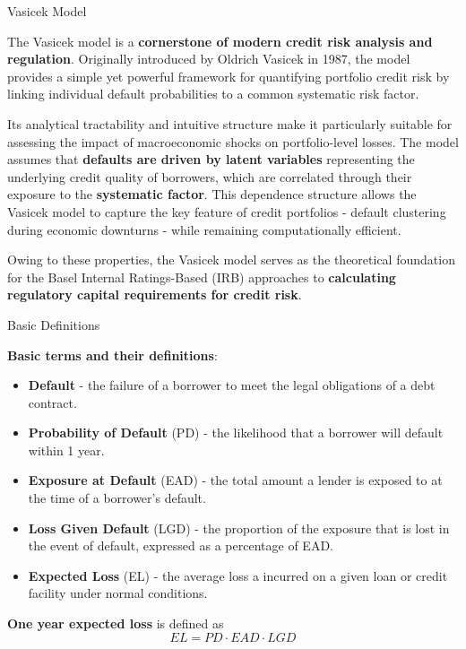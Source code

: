 \documentclass{beamer}
\begin{document}
\begin{frame}{Vasicek Model}
\justifying
\small

The Vasicek model is a \textbf{cornerstone of modern credit risk analysis and regulation}. Originally introduced by Oldrich Vasicek in 1987, the model provides a simple yet powerful framework for quantifying portfolio credit risk by linking individual default probabilities to a common systematic risk factor.

\medskip

Its analytical tractability and intuitive structure make it particularly suitable for assessing the impact of macroeconomic shocks on portfolio-level losses. The model assumes that \textbf{defaults are driven by latent variables} representing the underlying credit quality of borrowers, which are correlated through their exposure to the \textbf{systematic factor}. This dependence structure allows the Vasicek model to capture the key feature of credit portfolios - default clustering during economic downturns - while remaining computationally efficient.

\medskip

Owing to these properties, the Vasicek model serves as the theoretical foundation for the Basel Internal Ratings-Based (IRB) approaches to \textbf{calculating regulatory capital requirements for credit risk}.

\end{frame}

\begin{frame}{Basic Definitions}
\justifying
\small

\textbf{Basic terms and their definitions}:
\begin{itemize}
\item \textbf{Default} - the failure of a borrower to meet the legal obligations of a debt contract.
\item \textbf{Probability of Default} (PD) - the likelihood that a borrower will default within 1 year.
\item \textbf{Exposure at Default} (EAD) - the total amount a lender is exposed to at the time of a borrower's default.
\item \textbf{Loss Given Default} (LGD) - the proportion of the exposure that is lost in the event of default, expressed as a percentage of EAD.
\item \textbf{Expected Loss} (EL) - the average loss a incurred on a given loan or credit facility under normal conditions.
\end{itemize}

\medskip

\textbf{One year expected loss} is defined as
\begin{equation}
EL = PD \cdot EAD \cdot LGD
\end{equation}

\end{frame}
\end{document}
